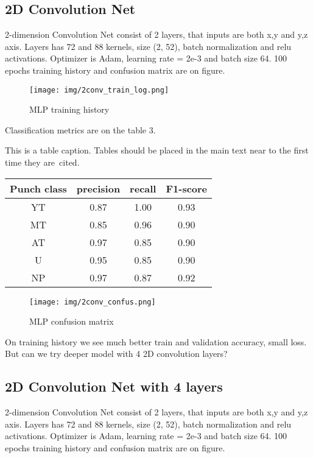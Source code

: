 \documentclass[sport,article,submit,moreauthors,pdftex]{Definitions/mdpi}
\begin{document}
\subsection{2D Convolution Net}
2-dimension Convolution Net consist of 2 layers, that inputs are both x,y and y,z axis. Layers has  72 and 88 kernels, size (2, 52), batch normalization and relu activations. 
Optimizer is Adam, learning rate = 2e-3 and batch size 64.
100 epochs training history and confusion matrix are on figure.

\begin{figure}[H]
\texttt{[image: img/2conv\_train\_log.png]}
\caption{MLP training history}
\end{figure} 

Classification metrics are on the table 3.

\begin{specialtable}[H] 
\caption{This is a table caption. Tables should be placed in the main text near to the first time they are~cited.\label{tab3}}
\begin{tabular}{cccc}
\toprule
\textbf{Punch class}	&\textbf{precision}	& \textbf{recall}	& \textbf{F1-score}\\
\midrule
YT		& 0.87		& 1.00		& 0.93 \\
MT		& 0.85		& 0.96		& 0.90 \\
AT		& 0.97		& 0.85		& 0.90 \\
U		& 0.95		& 0.85		& 0.90 \\
NP		& 0.97		& 0.87		& 0.92 \\
\bottomrule
\end{tabular}
\end{specialtable}

\begin{figure}[H]
\texttt{[image: img/2conv\_confus.png]}
\caption{MLP confusion matrix}
\end{figure} 


On training history we see much better train and validation accuracy, small loss.
But can we try deeper model with 4 2D convolution layers?


\subsection{2D Convolution Net with 4 layers}

2-dimension Convolution Net consist of 2 layers, that inputs are both x,y and y,z axis. Layers has  72 and 88 kernels, size (2, 52), batch normalization and relu activations. 
Optimizer is Adam, learning rate = 2e-3 and batch size 64.
100 epochs training history and confusion matrix are on figure.
\end{document}
